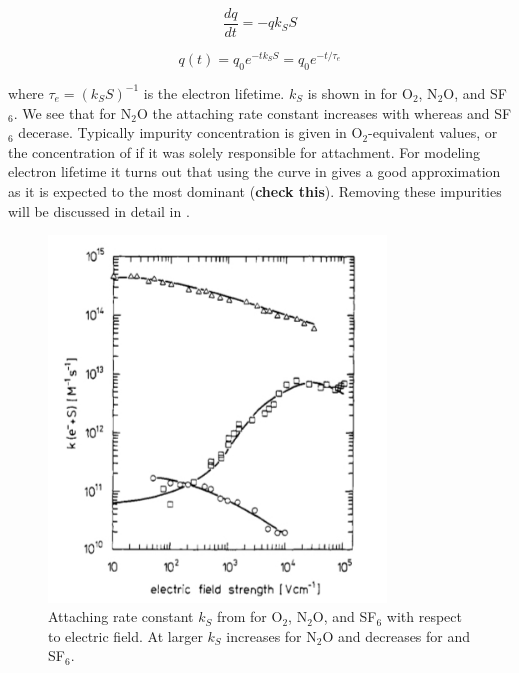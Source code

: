 \begin{equation}
\frac{dq}{dt} = -qk_{S}S
\label{eq:lifetime_diff_eq}
\end{equation}

\begin{equation}
q(t) = q_{0}e^{-tk_{S}S} = q_{0}e^{-t/\tau_{e}}
\label{eq:lifetime_equation}
\end{equation}

\noindent where $\tau_{e} = (k_{S}S)^{-1}$ is the electron lifetime.  $k_{S}$ is shown in  for
O$_{2}$,
N$_{2}$O, and SF$_{6}$.  We see that for N$_{2}$O the attaching rate constant increases with \efield whereas \otwo and SF$_{6}$
decerase.  Typically impurity concentration is given in O$_{2}$-equivalent values, or the concentration of \otwo if it was solely
responsible for \electron attachment.  For modeling electron lifetime it turns out that using the \otwo curve in
 gives a good approximation as it is expected to the most dominant (\textbf{check this}).  Removing these
impurities will be discussed in detail in .

\begin{figure}
\includegraphics[width=0.8\textwidth]{AttachmentRate}
\caption{Attaching rate constant $k_{S}$ from  for O$_{2}$, N$_{2}$O, and SF$_{6}$ with respect to electric field.  At
larger \efields $k_{S}$ increases for N$_{2}$O and decreases for \otwo and SF$_{6}$.}
\label{fig:attachment_rate}
\end{figure}

